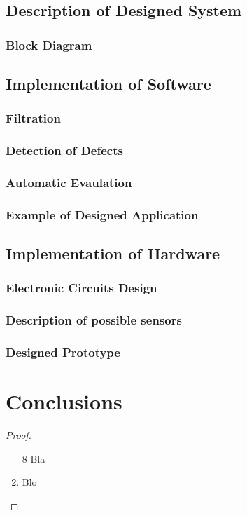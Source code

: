\documentclass[twoside]{ctuthesis}
\theoremstyle{plain}
\theoremstyle{definition}
\theoremstyle{note}
\begin{document}
\section{Description of Designed System}
\subsection{Block Diagram}
\section{Implementation of Software}
\subsection{Filtration}
\subsection{Detection of Defects}
\subsection{Automatic Evaulation}
\subsection{Example of Designed Application}
\section{Implementation of Hardware}
\subsection{Electronic Circuits Design}
\subsection{Description of possible sensors}
\subsection{Designed Prototype}
\chapter{Conclusions}


\medskip

\begin{proof}\begin{enumerate} \item[8] Bla \item Blo \end{enumerate} \end{proof}

\appendix

\printindex

\appendix

%



\end{document}
